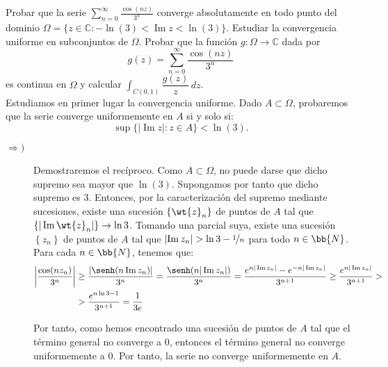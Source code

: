 \documentclass[12pt]{article}
\renewcommand{\Im}{\operatorname{Im}}
\begin{document}
    \newpage
    \setcounter{ejercicio}{0}

    \begin{ejercicio}[4 puntos]
        Probar que la serie $\displaystyle \sum_{n=0}^{\infty} \frac{\cos(nz)}{3^n}$ converge absolutamente en todo punto del dominio $\Omega = \{ z \in \mathbb{C} : -\ln(3) < \Im z < \ln(3) \}$. Estudiar la convergencia uniforme en subconjuntos de $\Omega$. Probar que la función $g : \Omega \to \mathbb{C}$ dada por
        \[
            g(z) = \sum_{n=0}^{\infty} \frac{\cos(nz)}{3^n}
        \]
        es continua en $\Omega$ y calcular $\displaystyle \int_{C(0,1)} \dfrac{g(z)}{z} \, dz$.\\

        Estudiamos en primer lugar la convergencia uniforme. Dado $A\subset \Omega$, probaremos que la serie converge uniformemente en $A$ si y solo si:
        \[
            \sup\{|\Im z| : z\in A\} < \ln(3).
        \]
        \begin{description}
            \item[$\Longrightarrow)$] Demostraremos el recíproco. Como $A\subset \Omega$, no puede darse que dicho supremo sea mayor que $\ln(3)$. Supongamos por tanto que dicho supremo es $3$. Entonces, por la caracterización del supremo mediante sucesiones, existe una sucesión $\left\{\wt{z}_n\right\}$ de puntos de $A$ tal que $\left\{|\Im \wt{z}_n|\right\}\to \ln 3$. Tomando una parcial suya, existe una sucesión $\left\{z_n\right\}$ de puntos de $A$ tal que $\left|\Im z_n\right|>\ln 3 - \nicefrac{1}{n}$ para todo $n\in \bb{N}$.\\
            
            Para cada $n\in \bb{N}$, tenemos que:
            \begin{align*}
                \left|\dfrac{\cos(nz_n)}{3^n}\right| &\geq \dfrac{\left|\senh(n\Im z_n)\right|}{3^{n}}
                = \dfrac{\senh(n|\Im z_n|)}{3^{n}}
                = \dfrac{e^{n|\Im z_n|}-e^{-n|\Im z_n|}}{3^{n+1}} \geq \dfrac{e^{n|\Im z_n|}}{3^{n+1}}
                > \\
                &> \dfrac{e^{n\ln 3 -1}}{3^{n+1}}
                = \dfrac{1}{3e}
            \end{align*}

            Por tanto, como hemos encontrado una sucesión de puntos de $A$ tal que el término general no converge a $0$, entonces el término general no converge uniformemente a $0$. Por tanto, la serie no converge uniformemente en $A$.


\end{description}
\end{ejercicio}
\end{document}
